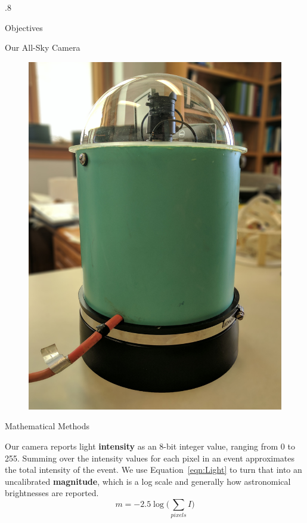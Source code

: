 \documentclass[final]{beamer}
\newlength{\twocolwid}
\begin{document}
\begin{frame}[t]
\begin{columns}[t]
\begin{column}{.8\twocolwid}
\begin{alertblock}{Objectives}
\end{alertblock}


\begin{alertblock}{Our All-Sky Camera}

\begin{figure}
\centering
\includegraphics[width=.856\linewidth]{deesix.jpg}
  \label{fig:d6}
\end{figure}

\end{alertblock}
\begin{block}{Mathematical Methods}

	Our camera reports light \textbf{intensity} as an 8-bit integer value, ranging from 0 to 255. Summing over the intensity values for each pixel in an event approximates the total intensity of the event. We use Equation~\ref{eqn:Light} to turn that into an uncalibrated \textbf{magnitude}, which is a log scale and generally how astronomical brightnesses are reported. 
\begin{equation}
	m = -2.5 \log\Big(\sum_{pixels} I\Big)
\label{eqn:Light}
\end{equation}


\end{block}
\end{column}
\end{columns}
\end{frame}
\end{document}
